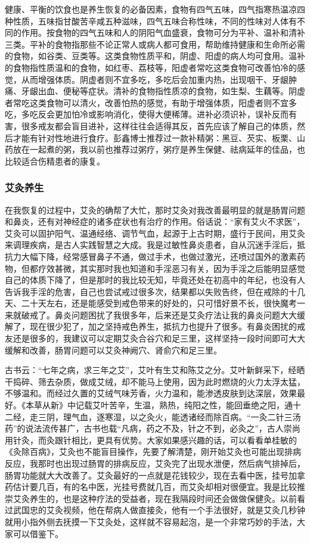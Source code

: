 健康、平衡的饮食也是养生恢复的必备因素，食物有四气五味，四气指寒热温凉四种性质，五味指甘酸苦辛咸五种滋味，四气五味合称性味，不同的性味对人体有不同的作用。按食物的四气五味和人的阴阳气血盛衰，食物可分为平补、温补和清补三类。平补的食物指那些不论正常人或病人都可食用，帮助维持健康和生命所必需的食物，如谷类、豆类等。这类食物性质平和，阴虚、阳虚的病人均可食用。温补的食物指性质温和的食物，如红枣、荔枝等，阳虚者常吃这类食物可改善怕冷的感觉，从而增强体质。阴虚者则不宜多吃，多吃后会加重内热，出现咽干、牙龈肿痛、牙龈出血、便秘等症状。清补的食物指性质凉的食物，如生梨、生藕等。阴虚者常吃这类食物可以清火，改善怕热的感觉，有助于增强体质，阳虚者则不宜多吃，多吃反会更加怕冷或影响消化，使得大便稀薄。进补必须识补，误补反而有害，很多戒友都会盲目进补，这样往往会适得其反，首先应该了解自己的体质，然后才能有针对性地进行食疗。彭鑫博士推荐过一款补精粥：黑豆、芡实、板栗、山药放在一起煮的粥，我以前也推荐过粥疗，粥疗是养生保健、祛病延年的佳品，也比较适合伤精患者的康复。

\subsubsection{艾灸养生}

在我恢复的过程中，艾灸的确帮了大忙，那时艾灸对我改善最明显的就是肠胃问题和鼻炎，还有对神经症的诸多症状也有治疗的作用。俗话说：“家有艾火不求医”，艾灸可以固护阳气、温通经络、调节气血，起源于上古时期，盛行于民间，用艾灸来调理疾病，是古人实践智慧之大成。我是过敏性鼻炎患者，自从沉迷手淫后，抵抗力大幅下降，经常感冒鼻子不通，做过手术，也做过激光，还喷过国外的激素药物，但都疗效甚微，其实那时我也知道和手淫恶习有关，因为手淫之后能明显感觉自己的体质下降了，但是那时的我比较无知，毕竟还处在初高中的年纪，也没有人告诉我手淫的危害，自己也尝试戒过很多次，结果都以失败告终，但在戒除的十几天、二十天左右，还是能感受到戒色带来的好处的，只可惜好景不长，很快魔考一来就破戒了。鼻炎问题困扰了我很多年，后来还是艾灸疗法让我的鼻炎问题大大缓解了，现在很少犯了，加之坚持戒色养生，抵抗力也提升了很多。有鼻炎困扰的戒友还是很多的，我建议可以定期艾灸合谷穴和足三里，这样坚持一段时间即可大大缓解和改善，肠胃问题可以艾灸神阙穴、肾俞穴和足三里。

古书云：“七年之病，求三年之艾”，艾叶有生艾和陈艾之分。艾叶新鲜采下，经晒干捣碎、筛去杂质，做成艾绒，却不能马上使用，因为此时燃烧的火力太浮太猛，不够温和。而经过久置的艾绒气味芳香，火力温和，能渗透皮肤到达深层，效果最好。《本草从新》中记载艾叶苦辛，生温，熟热，纯阳之性，能回垂绝之阳，通十二经，走三阴，理气血，逐寒湿，以之灸火，能透诸经而除百病。“一灸二针三汤药”的说法流传甚广，古书也载“凡病，药之不及，针之不到，必灸之”，古人崇尚用针灸，而灸跟针相比，更具有优势。大家如果感兴趣的话，可以看看单桂敏的《灸除百病》，艾灸也不能盲目操作，先要了解清楚，刚开始艾灸也可能出现排病反应，我那时也出现过肠胃的排病反应，艾灸完了出现水泄便，然后病气排掉后，肠胃功能就大大改善了。艾灸最好的一点就是花钱较少，现在去看中医，挂号加拿药估计要几百，有的名中医，光挂号费就几百，而艾灸却相对很便宜。我是比较推崇艾灸养生的，也是这种疗法的受益者，现在我隔段时间还会做做保健灸。以前看过武国忠的艾灸视频，他在帮病人做直接灸，他有一个手法很好，就是艾灸几秒钟就用小指外侧去抚摸一下艾灸处，这样就不容易起泡，是一个非常巧妙的手法，大家可以借鉴下。

